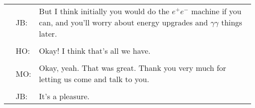 \clearpage

\begin{table}[!ht]
\begin{tabular}{@{}p{0mm}p{5mm}p{120mm}@{}}
& JB: & But I think initially you would do the $e^{+}e^{-}$ machine if you can, and you'll worry about energy upgrades and $\gamma\gamma$ things later.\\\\

& HO: & Okay! I think that's all we have.\\\\

& MO: & Okay, yeah. That was great. Thank you very much for letting us come and talk to you.\\\\

& JB: & It's a pleasure.
\end{tabular}
\end{table}

